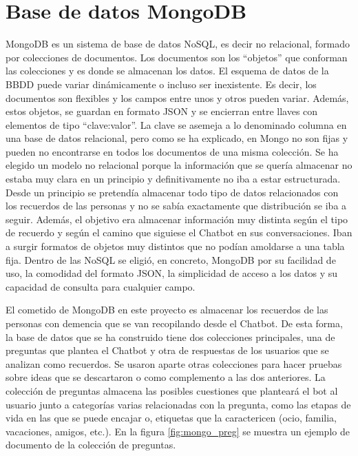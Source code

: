 \section{Base de datos MongoDB}

MongoDB es un sistema de base de datos NoSQL, es decir no relacional, formado por colecciones de documentos. Los documentos son los ``objetos'' que conforman las colecciones y es donde se almacenan los datos. El esquema de datos de la BBDD puede variar dinámicamente o incluso ser inexistente. Es decir, los documentos son flexibles y los campos entre unos y otros pueden variar. Además, estos objetos, se guardan en formato JSON y se encierran entre llaves con elementos de tipo ``clave:valor''. La clave se asemeja a lo denominado columna en una base de datos relacional, pero como se ha explicado, en Mongo no son fijas y pueden no encontrarse en todos los documentos de una misma colección. Se ha elegido un modelo no relacional porque la información que se quería almacenar no estaba muy clara en un principio y definitivamente no iba a estar estructurada. Desde un principio se pretendía almacenar todo tipo de datos relacionados con los recuerdos de las personas y no se sabía exactamente que distribución se iba a seguir. Además, el objetivo era almacenar información muy distinta según el tipo de recuerdo y según el camino que siguiese el Chatbot en sus conversaciones. Iban a surgir formatos de objetos muy distintos que no podían amoldarse a una tabla fija. Dentro de las NoSQL se eligió, en concreto, MongoDB por su facilidad de uso, la comodidad del formato JSON, la simplicidad de acceso a los datos y su capacidad de consulta para cualquier campo. 

El cometido de MongoDB en este proyecto es almacenar los recuerdos de las personas con demencia que se van recopilando desde el Chatbot. De esta forma, la base de datos que se ha construido tiene dos colecciones principales, una de preguntas que plantea el Chatbot y otra de respuestas de los usuarios que se analizan como recuerdos. Se usaron aparte otras colecciones para hacer pruebas sobre ideas que se descartaron o como complemento a las dos anteriores. La colección de preguntas almacena las posibles cuestiones que planteará el bot al usuario junto a categorías varias relacionadas con la pregunta, como las etapas de vida en las que se puede encajar o, etiquetas que la caractericen (ocio, familia, vacaciones, amigos, etc.). En la figura \ref{fig:mongo_preg} se muestra un ejemplo de documento de la colección de preguntas.

